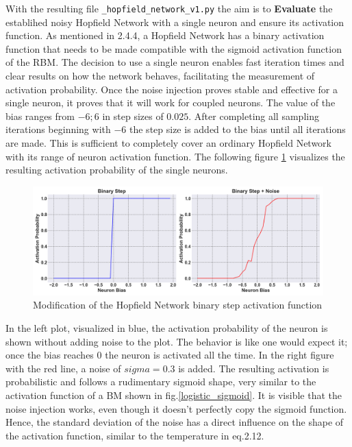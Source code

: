 With the resulting file \texttt{\_hopfield\_network\_v1.py} the aim is to \textbf{Evaluate} the establihed noisy Hopfield Network with a single neuron 
and ensure its activation function.
As mentioned in 2.4.4, a Hopfield Network has a binary activation function that needs to be made compatible with the sigmoid activation function of the \ac{RBM}.
The decision to use a single neuron enables fast iteration times and clear results on how the network behaves, facilitating the measurement of activation probability.
Once the noise injection proves stable and effective for a single neuron, it proves that it will work for coupled neurons.
The value of the bias ranges from \(-6; 6\) in step sizes of \(0.025\). After completing all sampling iterations beginning with \(-6\) the step size is added to the bias until all iterations are made.
This is sufficient to completely cover an ordinary Hopfield Network with its range of neuron activation function. 
The following figure \ref{Noisy_acitivation_function_bad} visualizes the resulting activation probability of the single neurons. 
\begin{figure}[H]
    \centering
    \includegraphics[width=1\linewidth]{graphics/combined_noise_activation_plots.png}
    \caption{Modification of the Hopfield Network binary step activation function}
    \label{Noisy_acitivation_function_bad}
\end{figure}
In the left plot, visualized in blue, the activation probability of the neuron is shown without adding noise to the plot. 
The behavior is like one would expect it; once the bias reaches 0 the neuron is activated all the time.
In the right figure with the red line, a noise of \(sigma=0.3\) is added.
The resulting activation is probabilistic and follows a rudimentary sigmoid shape, very similar to the activation function of a \ac{BM} shown in fig.\ref{logistic_sigmoid}.
It is visible that the noise injection works, even though it doesn't perfectly copy the sigmoid function.
Hence, the standard deviation of the noise has a direct influence on the shape of the activation function, similar to the temperature in eq.2.12. 

